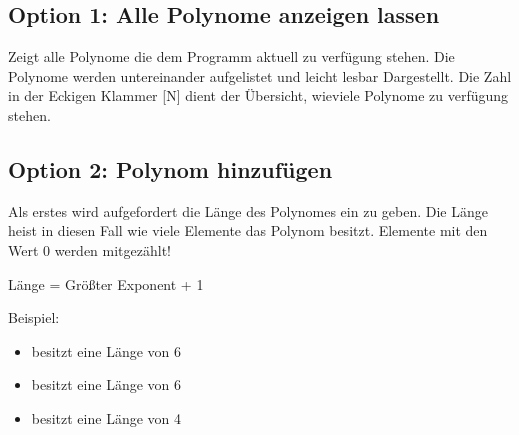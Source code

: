 \documentclass[letterpaper,10pt,ngerman]{sphinxmanual}
\begin{document}
\begin{DUlineblock}{0em}
\item[] 
\end{DUlineblock}

\noindent{}


\subsection{Option 1: Alle Polynome anzeigen lassen}
\label{menu:option-1-alle-polynome-anzeigen-lassen}
Zeigt alle Polynome die dem Programm aktuell zu verfügung stehen. Die Polynome
werden untereinander aufgelistet und leicht lesbar Dargestellt. Die Zahl in der Eckigen Klammer {[}N{]}
dient der Übersicht, wieviele Polynome zu verfügung stehen.

\noindent{}


\subsection{Option 2: Polynom hinzufügen}
\label{menu:option-2-polynom-hinzufugen}
Als erstes wird aufgefordert die Länge des Polynomes ein zu geben. Die Länge heist in diesen Fall wie viele
Elemente das Polynom besitzt. Elemente mit den Wert 0 werden mitgezählt!

\begin{DUlineblock}{0em}
\item[] Länge = Größter Exponent + 1
\end{DUlineblock}

\begin{DUlineblock}{0em}
\item[] Beispiel:
\end{DUlineblock}
\begin{itemize}
\item {} 
 besitzt eine Länge von 6

\item {} 
 besitzt eine Länge von 6

\item {} 
 besitzt eine Länge von 4

\end{itemize}
\end{document}
